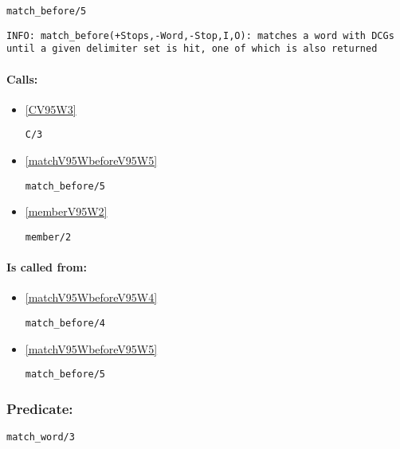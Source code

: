 \begin{verbatim}
match_before/5
\end{verbatim}

{\small \begin{verbatim}
INFO: match_before(+Stops,-Word,-Stop,I,O): matches a word with DCGs until a given delimiter set is hit, one of which is also returned

\end{verbatim}}
\paragraph{Calls:} 
\begin{itemize}
\item \ref{CV95W3} 
\begin{verbatim}
C/3
\end{verbatim}

\item \ref{matchV95WbeforeV95W5} 
\begin{verbatim}
match_before/5
\end{verbatim}

\item \ref{memberV95W2} 
\begin{verbatim}
member/2
\end{verbatim}

\end{itemize}
\paragraph{Is called from:} 
\begin{itemize}
\item \ref{matchV95WbeforeV95W4} 
\begin{verbatim}
match_before/4
\end{verbatim}

\item \ref{matchV95WbeforeV95W5} 
\begin{verbatim}
match_before/5
\end{verbatim}

\end{itemize}

\subsubsection{Predicate:} \label{matchV95WwordV95W3}

\begin{verbatim}
match_word/3
\end{verbatim}

